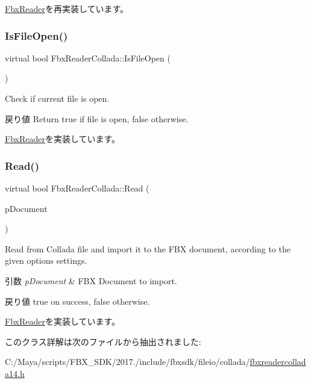 \hyperlink{class_fbx_reader_a9d7b40684bb3181219945eb0c73fb9d1}{Fbx\+Reader}を再実装しています。

\mbox{\label{class_fbx_reader_collada_a6732d6488100827a26065750e80f3a27}} 
\subsubsection{\texorpdfstring{Is\+File\+Open()}{IsFileOpen()}}
{\footnotesize\ttfamily virtual bool Fbx\+Reader\+Collada\+::\+Is\+File\+Open (\begin{DoxyParamCaption}{ }\end{DoxyParamCaption})\hspace{0.3cm}{\ttfamily [virtual]}}

Check if current file is open. \begin{DoxyReturn}{戻り値}
Return true if file is open, false otherwise. 
\end{DoxyReturn}


\hyperlink{class_fbx_reader_af86b437702ffc840cfab52185cbc7232}{Fbx\+Reader}を実装しています。

\mbox{\label{class_fbx_reader_collada_afbffa96769d22d8e5df25c83d15bd8cb}} 
\subsubsection{\texorpdfstring{Read()}{Read()}}
{\footnotesize\ttfamily virtual bool Fbx\+Reader\+Collada\+::\+Read (\begin{DoxyParamCaption}\item[{\hyperlink{class_fbx_document}{Fbx\+Document} $\ast$}]{p\+Document }\end{DoxyParamCaption})\hspace{0.3cm}{\ttfamily [virtual]}}

Read from Collada file and import it to the F\+BX document, according to the given options settings. 
\begin{DoxyParams}{引数}
{\em p\+Document} & F\+BX Document to import. \\
\hline
\end{DoxyParams}
\begin{DoxyReturn}{戻り値}
true on success, false otherwise. 
\end{DoxyReturn}


\hyperlink{class_fbx_reader_a29941746acc73d7ffd2411a9be9d2525}{Fbx\+Reader}を実装しています。



このクラス詳解は次のファイルから抽出されました\+:\begin{DoxyCompactItemize}
\item 
C\+:/\+Maya/scripts/\+F\+B\+X\+\_\+\+S\+D\+K/2017./include/fbxsdk/fileio/collada/\hyperlink{fbxreadercollada14_8h}{fbxreadercollada14.\+h}\end{DoxyCompactItemize}

